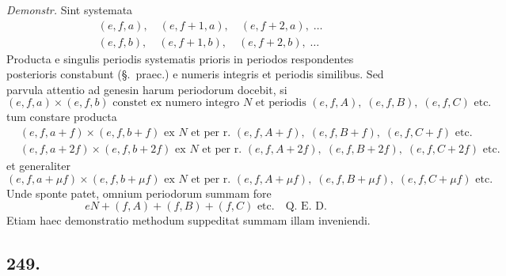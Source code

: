 \documentclass[12pt,a4paper]{article}
\newcommand{\Sec}{\S}
\begin{document}
\textit{Demonstr.} Sint systemata
\[
\begin{aligned}
&(e,f,a),\quad (e,f+1,a),\quad (e,f+2,a),\; \ldots\\
&(e,f,b),\quad (e,f+1,b),\quad (e,f+2,b),\; \ldots
\end{aligned}
\]
Producta e singulis periodis systematis prioris in periodos respondentes posterioris constabunt (\Sec.~praec.) e numeris integris et periodis similibus. Sed parvula attentio ad genesin harum periodorum docebit, si
\[
(e,f,a) \times (e,f,b) \text{ constet ex numero integro } N \text{ et periodis } (e,f,A),\; (e,f,B),\; (e,f,C) \text{ etc.}
\]
tum constare producta
\[
\begin{aligned}
&(e,f,a+f) \times (e,f,b+f) \text{ ex } N \text{ et per r.\ } (e,f,A+f),\; (e,f,B+f),\; (e,f,C+f) \text{ etc.}\\
&(e,f,a+2f) \times (e,f,b+2f) \text{ ex } N \text{ et per r.\ } (e,f,A+2f),\; (e,f,B+2f),\; (e,f,C+2f) \text{ etc.}
\end{aligned}
\]
et generaliter
\[
(e,f,a+\mu f) \times (e,f,b+\mu f) \text{ ex } N \text{ et per r.\ } (e,f,A+\mu f),\; (e,f,B+\mu f),\; (e,f,C+\mu f) \text{ etc.}
\]
Unde sponte patet, omnium periodorum summam fore
\[
eN + (f,A) + (f,B) + (f,C) \text{ etc.} \quad \text{Q.~E.~D.}
\]
Etiam haec demonstratio methodum suppeditat summam illam inveniendi.

\subsection*{249.}
\end{document}

